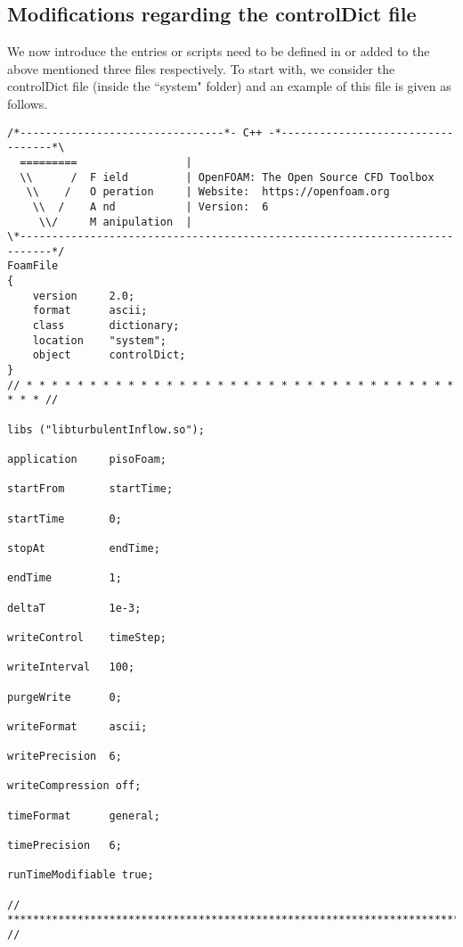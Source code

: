 \subsection{Modifications regarding the \textcolor{mauve}{controlDict} file}

We now introduce the entries or scripts need to be defined in or added to the above mentioned three files respectively. To start with, we consider the \textcolor{mauve}{controlDict} file (inside the \textcolor{mauve}{``system"} folder) and an example of this file is given as follows.

\begin{lstlisting}
/*--------------------------------*- C++ -*----------------------------------*\
  =========                 |
  \\      /  F ield         | OpenFOAM: The Open Source CFD Toolbox
   \\    /   O peration     | Website:  https://openfoam.org
    \\  /    A nd           | Version:  6
     \\/     M anipulation  |
\*---------------------------------------------------------------------------*/
FoamFile
{
    version     2.0;
    format      ascii;
    class       dictionary;
    location    "system";
    object      controlDict;
}
// * * * * * * * * * * * * * * * * * * * * * * * * * * * * * * * * * * * * * //

libs ("libturbulentInflow.so");

application     pisoFoam;

startFrom       startTime;

startTime       0;

stopAt          endTime;

endTime         1;

deltaT          1e-3;

writeControl    timeStep;

writeInterval   100;

purgeWrite      0;

writeFormat     ascii;

writePrecision  6;

writeCompression off;

timeFormat      general;

timePrecision   6;

runTimeModifiable true;

// ************************************************************************* //
\end{lstlisting}

